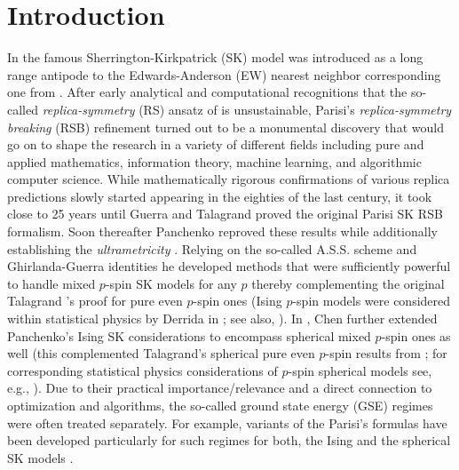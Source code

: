 \documentclass[10pt]{article}
\begin{document}
\section{Introduction}
\label{sec:back}





In \cite{SheKir72} the famous Sherrington-Kirkpatrick (SK) model was introduced as a long range antipode to the  Edwards-Anderson (EW) nearest neighbor  corresponding one from  \cite{EdwAnd75}.   After early analytical \cite{SheKir72} and computational \cite{SheKir78} recognitions that the so-called \emph{replica-symmetry} (RS) ansatz of \cite{EdwAnd75} is unsustainable, Parisi's \emph{replica-symmetry breaking} (RSB) refinement  \cite{Par79,Parisi80,Par80} turned out to be a monumental discovery that would go on to shape the research in a variety of different fields including pure and applied mathematics, information theory, machine learning, and algorithmic computer science. While mathematically rigorous confirmations of various replica predictions slowly started appearing in the eighties of the last century, it took close to 25 years until Guerra \cite{Guerra03} and Talagrand \cite{TalSK06} proved the original Parisi SK RSB formalism. Soon thereafter Panchenko  \cite{Pan10,Pan10a,Pan13,Pan13a} reproved these results while additionally establishing the \emph{ultrametricity} \cite{Par83}. Relying on the so-called A.S.S. scheme \cite{Aizetal03} and Ghirlanda-Guerra identities \cite{Pan10,Pan10a} he developed methods that were sufficiently powerful to handle mixed $p$-spin SK models for any $p$ thereby complementing  the original Talagrand 's proof for pure even $p$-spin ones (Ising $p$-spin models were considered within statistical physics by Derrida in \cite{Derrida80}; see also, \cite{Derrida81}). In \cite{ChenSphSK13}, Chen further extended Panchenko's Ising SK considerations to encompass spherical mixed $p$-spin ones as well (this complemented Talagrand's spherical pure even $p$-spin results from \cite{TalSph06}; for corresponding statistical physics considerations of $p$-spin spherical models see, e.g., \cite{KostSKSph76,Crisanti92}). Due to their practical importance/relevance and a direct connection to optimization and algorithms, the so-called ground state energy (GSE) regimes were often treated separately. For example, variants of the Parisi's formulas have been developed particularly for such regimes for both, the Ising  \cite{AuffChen17}  and the spherical SK models  \cite{JagTob17,ChenSen17}.
\end{document}
